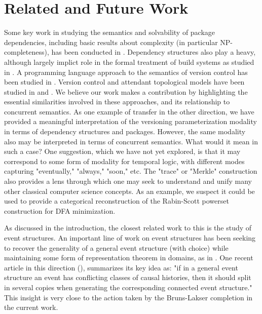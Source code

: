 \documentclass[hoptionsi,review,format=acmsmall]{acmart}
\theoremstyle{definition}
\begin{document}



\section{Related and Future Work}

Some key work in studying the semantics and solvability of package dependencies, including basic results about complexity (in particular NP-completeness),  has been conducted in \cite{di2006edos, abate2012dependency}. Dependency structures also play a heavy, although largely implict role in the formal treatment of build systems as studied in \cite{mitchell:shake_24_sep_2018}. A programming language approach to the semantics of version control has been studied in \cite{swierstra2014semantics}. Version control and attendant topological models have been studied in \cite{angiuli2014homotopical} and \cite{mimram2013categorical}. We believe our work makes a contribution by highlighting the essential similarities involved in these approaches, and its relationship to concurrent semantics. As one example of transfer in the other direction, we have provided a meaningful interpretation of the versioning parameterization modality in terms of dependency structures and packages. However, the same modality also may be interpreted in terms of concurrent semantics. What would it mean in such a case? One suggestion, which we have not yet explored, is that it may correspond to some form of modality for temporal logic, with different modes capturing "eventually," "always," "soon," etc. The "trace" or "Merkle" construction also provides a lens through which one may seek to understand and unify many other classical computer science concepts. As an example, we suspect it could be used to provide a categorical reconstruction of the Rabin-Scott powerset construction for DFA minimization.

As discussed in the introduction, the closest related work to this is the study of event structures. An important line of work on event structures has been seeking to recover the generality of a general event structure (with choice) while maintaining some form of representation theorem in domains, as in \cite{nielsen1981petri}. One recent article in this direction (\cite{DBLP:journals/corr/abs-1802-03726}), summarizes its key idea as: "if in a general event structure an event has conflicting classes of causal histories, then it should split in several copies when generating the corresponding connected event structure." This insight is very close to the action taken by the Bruns-Lakser completion in the current work.
\end{document}

